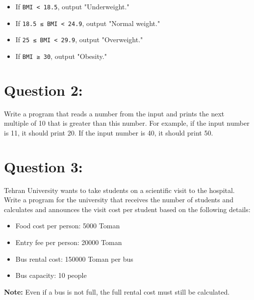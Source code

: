\documentclass{article}
\begin{document}
\begin{itemize}
    \item If \texttt{BMI < 18.5}, output "Underweight."
    \item If \texttt{18.5 ≤ BMI < 24.9}, output "Normal weight."
    \item If \texttt{25 ≤ BMI < 29.9}, output "Overweight."
    \item If \texttt{BMI ≥ 30}, output "Obesity."
\end{itemize}

\vspace{0.5cm}

\section*{\small Question 2:}
Write a program that reads a number from the input and prints the next multiple of 10 that is greater than this number. For example, if the input number is 11, it should print 20. If the input number is 40, it should print 50.

\vspace{0.5cm}

\section*{\small Question 3:}
Tehran University wants to take students on a scientific visit to the hospital. Write a program for the university that receives the number of students and calculates and announces the visit cost per student based on the following details:

\begin{itemize}
    \item Food cost per person: 5000 Toman
    \item Entry fee per person: 20000 Toman
    \item Bus rental cost: 150000 Toman per bus
    \item Bus capacity: 10 people
\end{itemize}
\textbf{Note:} Even if a bus is not full, the full rental cost must still be calculated.

\vspace{0.5cm}
\end{document}

